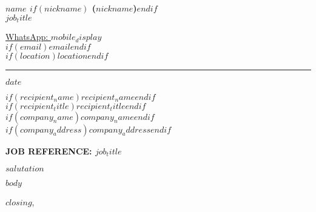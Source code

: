 \documentclass[11pt,a4paper]{article}
\begin{document}
\thispagestyle{empty}
\BgThispage

\begin{minipage}[t]{0.5\textwidth}
	{\Large\textbf{$name$ $if(nickname)$ ($nickname$)$endif$}}\\
	{\color{accentblue}\large $job_title$}
\end{minipage}
\begin{minipage}[t]{0.5\textwidth}
	\begin{flushright}
		\href{https://wa.me/$country_code$$mobile_raw$}{WhatsApp: $mobile_display$}\\
		$if(email)$\href{mailto:$email$}{$email$}$endif$\\
		$if(location)$$location$$endif$
	\end{flushright}
\end{minipage}

\noindent\rule{\textwidth}{0.5pt}

\begin{flushright}
	$date$
\end{flushright}

\begin{flushleft}
	$if(recipient_name)$$recipient_name$$endif$\\
	$if(recipient_title)$$recipient_title$$endif$\\
	$if(company_name)$$company_name$$endif$\\
	$if(company_address)$$company_address$$endif$
\end{flushleft}

\vspace{0.5cm}

\begin{center}
	\textbf{\MakeUppercase{Job Reference: $job_title$}}
\end{center}

\vspace{0.3cm}

\begin{flushleft}
	$salutation$
\end{flushleft}

\begin{spacing}{1.15}
	$body$
\end{spacing}

\vspace{0.4cm}
\begin{flushleft}
	$closing$,\\
	\vspace{0.1cm}
\end{flushleft}
\end{document}

